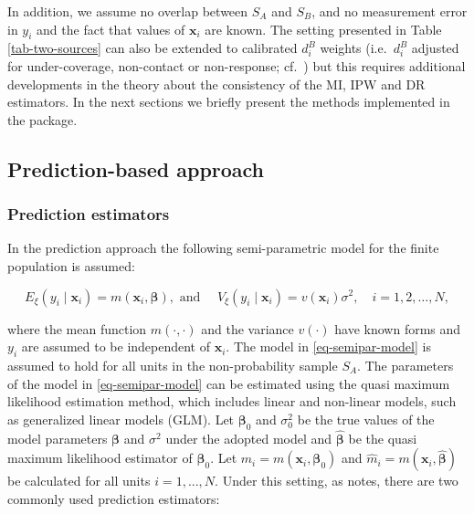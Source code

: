 \documentclass[
]{jss}
\begin{document}
In addition, we assume no overlap between \(S_A\) and \(S_B\), and no
measurement error in \(y_i\) and the fact that values of
\(\boldsymbol{x}_i\) are known. The setting presented in Table
\ref{tab-two-sources} can also be extended to calibrated \(d_i^B\)
weights (i.e.~\(d_i^B\) adjusted for under-coverage, non-contact or
non-response; cf.~\cite{sarndal2005estimation}) but this requires
additional developments in the theory about the consistency of the MI,
IPW and DR estimators. In the next sections we briefly present the
methods implemented in the package.

\subsection{Prediction-based approach}\label{sec-prediction}

\subsubsection{Prediction estimators}\label{prediction-estimators}

In the prediction approach the following semi-parametric model for the
finite population is assumed:

\begin{equation}
E_{\xi}\left(y_i \mid \boldsymbol{x}_i\right)=m\left(\boldsymbol{x}_i, \boldsymbol{\beta}\right), \text { and } \quad V_{\xi}\left(y_i \mid \boldsymbol{x}_i\right)=v\left(\boldsymbol{x}_i\right) \sigma^2, \quad i=1,2, \ldots, N,
\label{eq-semipar-model}
\end{equation}

where the mean function \(m(\cdot,\cdot)\) and the variance \(v(\cdot)\)
have known forms and \(y_i\) are assumed to be independent of
\(\boldsymbol{x}_i\). The model in \eqref{eq-semipar-model} is assumed
to hold for all units in the non-probability sample \(S_A\). The
parameters of the model in \eqref{eq-semipar-model} can be estimated
using the quasi maximum likelihood estimation method, which includes
linear and non-linear models, such as generalized linear models (GLM).
Let \(\boldsymbol{\beta}_0\) and \(\sigma^2_0\) be the true values of
the model parameters \(\boldsymbol{\beta}\) and \(\sigma^2\) under the
adopted model and \(\hat{\boldsymbol{\beta}}\) be the quasi maximum
likelihood estimator of \(\boldsymbol{\beta}_0\). Let
\(m_i=m(\boldsymbol{x}_i, \boldsymbol{\beta}_0)\) and
\(\hat{m}_i=m(\boldsymbol{x}_i, \hat{\boldsymbol{\beta}})\) be
calculated for all units \(i=1,...,N\). Under this setting, as
\citet{wu2022statistical} notes, there are two commonly used prediction
estimators:
\end{document}
